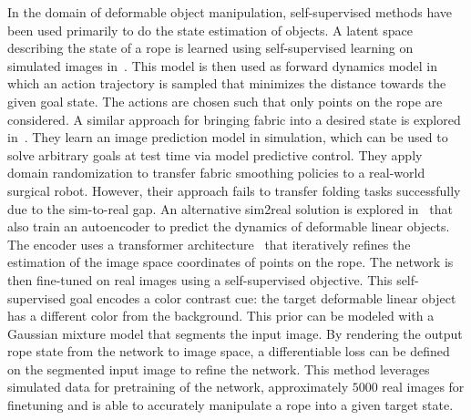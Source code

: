 \documentclass[\home/main.tex]{subfiles}
\begin{document}
In the domain of deformable object manipulation, self-supervised methods have been used primarily to do the state estimation of objects. A latent space describing the state of a rope is learned using self-supervised learning on simulated images in~\autocite{yan2020learning}. This model is then used as forward dynamics model in which an action trajectory is sampled that minimizes the distance towards the given goal state. The actions are chosen such that only points on the rope are considered. A similar approach for bringing fabric into a desired state is explored in~\autocite{fabric_vsf_2020}. They learn an image prediction model in simulation, which can be used to solve arbitrary goals at test time via model predictive control. They apply domain randomization to transfer fabric smoothing policies to a real-world surgical robot. However, their approach fails to transfer folding tasks successfully due to the sim-to-real gap. An alternative sim2real solution is explored in~\autocite{Mengyuan2020} that also train an autoencoder to predict the dynamics of deformable linear objects. The encoder uses a transformer architecture~\autocite{vaswani2017attention} that iteratively refines the estimation of the image space coordinates of points on the rope. The network is then fine-tuned on real images using a self-supervised objective. This self-supervised goal encodes a color contrast cue: the target deformable linear object has a different color from the background. This prior can be modeled with a Gaussian mixture model that segments the input image. By rendering the output rope state from the network to image space, a differentiable loss can be defined on the segmented input image to refine the network. This method leverages simulated data for pretraining of the network, approximately $5000$ real images for finetuning and is able to accurately manipulate a rope into a given target state. 
\end{document}

